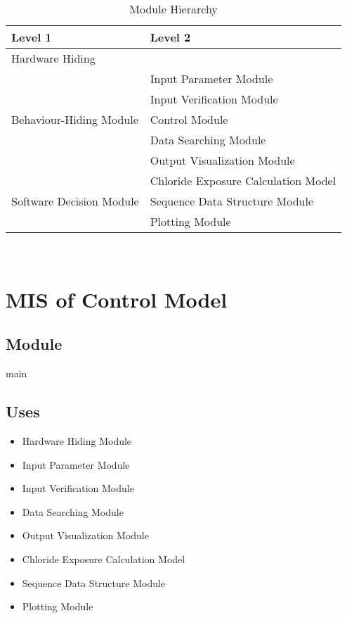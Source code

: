 \documentclass[12pt, titlepage]{article}
\begin{document}
\begin{table}[h!]
\centering
\begin{tabular}{p{} p{}}
\toprule
\textbf{Level 1} & \textbf{Level 2}\\
\midrule

{Hardware Hiding} & ~ \\
\midrule

\multirow{5}{0.3\textwidth}{Behaviour-Hiding Module} & Input Parameter Module\\
& Input Verification Module\\
& Control Module\\
& Data Searching Module\\
& Output Visualization Module\\

\midrule

\multirow{3}{0.3\textwidth}{Software Decision Module} & Chloride Exposure Calculation Model \\
& Sequence Data Structure Module \\
& Plotting Module \\
\bottomrule

\end{tabular}
\caption{Module Hierarchy}
\label{TblMH}
\end{table}

\newpage
~\newpage

\section{MIS of Control Model} \label{controlModule} 



\subsection{Module}

main

\subsection{Uses}
\begin{itemize}
\item Hardware Hiding Module
\item Input Parameter Module
\item Input Verification Module
\item Data Searching Module
\item Output Visualization Module
\item Chloride Exposure Calculation Model 
\item Sequence Data Structure Module 
\item Plotting Module 
\end{itemize}
\end{document}
